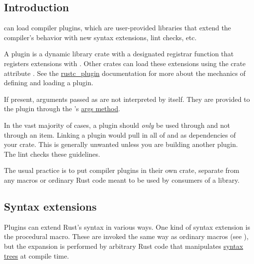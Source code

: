 \subsection*{Introduction}

 can load compiler plugins, which are user-provided libraries that extend the compiler's behavior with new syntax 
extensions, lint checks, etc.

\blank

A plugin is a dynamic library crate with a designated registrar function that registers extensions with . Other 
crates can load these extensions using the crate attribute \code{\#![plugin(...)]}. See the 
\href{https://doc.rust-lang.org/rustc\_plugin/}{rustc\_plugin} documentation for more about the mechanics of defining and 
loading a plugin.

\blank

If present, arguments passed as  are not interpreted by  itself. They are 
provided to the plugin through the 's 
\href{https://doc.rust-lang.org/rustc\_plugin/registry/struct.Registry.html\#method.args}{args method}.

\blank

In the vast majority of cases, a plugin should \emph{only} be used through \code{\#![plugin]} and not through an  
item. Linking a plugin would pull in all of  and  as dependencies of your crate. This is generally 
unwanted unless you are building another plugin. The  lint checks these guidelines.

\blank

The usual practice is to put compiler plugins in their own crate, separate from any  macros or ordinary Rust 
code meant to be used by consumers of a library.

\subsection*{Syntax extensions}

Plugins can extend Rust's syntax in various ways. One kind of syntax extension is the procedural macro. These are invoked 
the same way as ordinary macros (see ), but the expansion is performed by arbitrary Rust code 
that manipulates \href{https://doc.rust-lang.org/syntax/ast/}{syntax trees} at compile time.

\blank

